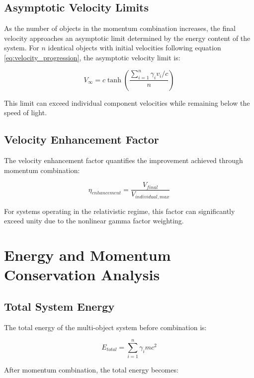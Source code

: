 \documentclass[11pt,a4paper]{article}
\theoremstyle{remark}
\begin{document}
\subsection{Asymptotic Velocity Limits}

As the number of objects in the momentum combination increases, the final velocity approaches an asymptotic limit determined by the energy content of the system. For $n$ identical objects with initial velocities following equation \ref{eq:velocity_progression}, the asymptotic velocity limit is:

\begin{equation}
V_{\infty} = c \tanh\left(\frac{\sum_{i=1}^{n} \gamma_i v_i/c}{n}\right)
\label{eq:asymptotic_velocity}
\end{equation}

This limit can exceed individual component velocities while remaining below the speed of light.

\subsection{Velocity Enhancement Factor}

The velocity enhancement factor quantifies the improvement achieved through momentum combination:

\begin{equation}
\eta_{enhancement} = \frac{V_{final}}{V_{individual,max}}
\label{eq:enhancement_factor}
\end{equation}

For systems operating in the relativistic regime, this factor can significantly exceed unity due to the nonlinear gamma factor weighting.

\section{Energy and Momentum Conservation Analysis}

\subsection{Total System Energy}

The total energy of the multi-object system before combination is:

\begin{equation}
E_{total} = \sum_{i=1}^{n} \gamma_i m c^2
\label{eq:total_energy}
\end{equation}

After momentum combination, the total energy becomes:
\end{document}
